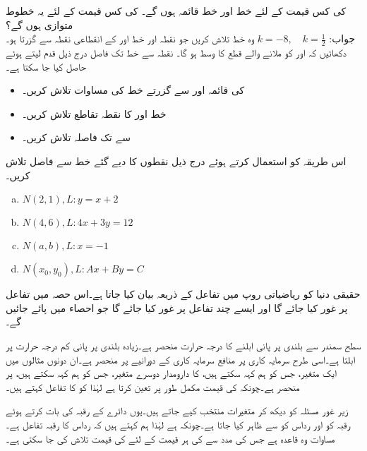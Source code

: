  کی کس قیمت کے لئے خط  اور خط  قائمہ ہوں گے۔ کی کس قیمت کے لئے یہ خطوط متوازی ہوں گے؟\\
جواب:\quad
$k=-8,\quad k=\tfrac{1}{2}$
وہ خط تلاش کریں جو نقطہ  اور خط  اور  کے انقطاعی نقطہ سے گزرتا ہو۔
دکھائیں کہ  اور  کو ملانے والے قطع کا وسط  ہو گا۔
\quad
نقطہ  سے خط  تک فاصل درج ذیل قدم لیتے ہوئے حاصل کیا جا سکتا ہے۔
\begin{itemize}
\item
{} کی قائمہ اور  سے گزرتے خط  کی مساوات تلاش کریں۔
\item
خط  اور  کا نقطہ تقاطع  تلاش کریں۔
\item
{} سے  تک فاصلہ تلاش کریں۔
\end{itemize}
اس طریقہ کو استعمال کرتے ہوئے درج ذیل نقطوں کا دیے گئے خط سے فاصل تلاش کریں۔
\begin{multicols}{2}
\begin{enumerate}[a)]
\item
$N(2,1), L:y=x+2$
\item
$N(4,6), L:4x+3y=12$
\item
$N(a,b),L:x=-1$
\item
$N(x_0,y_0), L:Ax+By=C$
\end{enumerate}
\end{multicols}

حقیقی دنیا کو ریاضیاتی روپ میں تفاعل کے ذریعہ بیان کیا جاتا ہے۔اس حصہ میں تفاعل پر غور کیا جائے گا اور ایسے چند تفاعل پر غور کیا جائے گا جو احصاء میں پائے جائیں گے۔

سطح سمندر سے بلندی پر پانی ابلنے کا درجہ حرارت منحصر ہے۔زیادہ بلندی پر پانی کم درجہ حرارت پر ابلتا ہے۔اسی طرح سرمایہ کاری پر منافع سرمایہ کاری کے دورانیے پر منحصر ہے۔ان دونوں مثالوں میں ایک متغیر، جس کو ہم  کہہ سکتے ہیں، کا دارومدار دوسرے متغیر، جس کو ہم  کہہ سکتے ہیں، پر منحصر ہے۔چونکہ  کی قیمت مکمل طور پر  تعین کرتا ہے لہٰذا  کو  کا تفاعل کہتے ہیں۔

زیر غور مسئلہ کو دیکھ کر متغیرات منتخب کیے جاتے ہیں۔یوں دائرے کے رقبہ کی بات کرتے ہوئے رقبہ کو  اور رداس کو  سے ظاہر کیا جاتا ہے۔چونکہ  ہے لہٰذا ہم کہتے ہیں کہ رداس  کا رقبہ  تفاعل ہے۔مساوات  وہ قاعدہ ہے جس کی مدد سے  کی ہر قیمت  کے لئے  کی  قیمت  تلاش کی جا سکتی ہے۔ 

